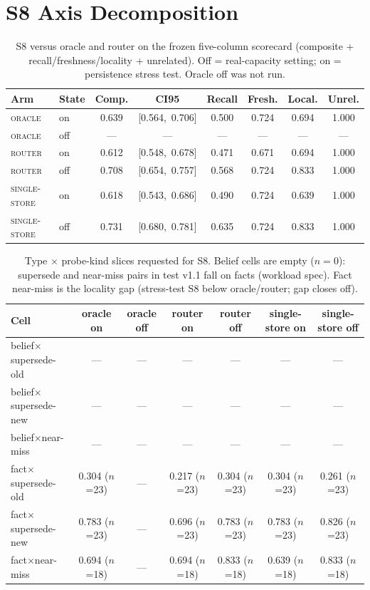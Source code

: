 \section{S8 Axis Decomposition}
\begin{table}[h]\centering
\caption{S8 versus oracle and router on the frozen five-column scorecard (composite + recall/freshness/locality + unrelated). Off = real-capacity setting; on = persistence stress test. Oracle off was not run.}
\label{tab:s8-axes}
\small\setlength{\tabcolsep}{3pt}
\begin{tabular}{llcccccc}\toprule
Arm & State & Comp. & CI95 & Recall & Fresh. & Local. & Unrel. \\
\midrule
\textsc{oracle} & on & 0.639 & [0.564,\ 0.706] & 0.500 & 0.724 & 0.694 & 1.000 \\
\textsc{oracle} & off & --- & --- & --- & --- & --- & --- \\
\textsc{router} & on & 0.612 & [0.548,\ 0.678] & 0.471 & 0.671 & 0.694 & 1.000 \\
\textsc{router} & off & 0.708 & [0.654,\ 0.757] & 0.568 & 0.724 & 0.833 & 1.000 \\
\textsc{single-store} & on & 0.618 & [0.543,\ 0.686] & 0.490 & 0.724 & 0.639 & 1.000 \\
\textsc{single-store} & off & 0.731 & [0.680,\ 0.781] & 0.635 & 0.724 & 0.833 & 1.000 \\
\bottomrule\end{tabular}
\end{table}
\begin{table}[h]\centering
\caption{Type $\times$ probe-kind slices requested for S8. Belief cells are empty ($n{=}0$): supersede and near-miss pairs in test v1.1 fall on facts (workload spec). Fact near-miss is the locality gap (stress-test S8 below oracle/router; gap closes off).}
\label{tab:s8-cells}
\small\setlength{\tabcolsep}{3pt}
\begin{tabular}{lcccccc}\toprule
Cell & oracle on & oracle off & router on & router off & single-store on & single-store off \\
\midrule
belief$\times$supersede-old & --- & --- & --- & --- & --- & --- \\
belief$\times$supersede-new & --- & --- & --- & --- & --- & --- \\
belief$\times$near-miss & --- & --- & --- & --- & --- & --- \\
fact$\times$supersede-old & 0.304 ($n$=23) & --- & 0.217 ($n$=23) & 0.304 ($n$=23) & 0.304 ($n$=23) & 0.261 ($n$=23) \\
fact$\times$supersede-new & 0.783 ($n$=23) & --- & 0.696 ($n$=23) & 0.783 ($n$=23) & 0.783 ($n$=23) & 0.826 ($n$=23) \\
fact$\times$near-miss & 0.694 ($n$=18) & --- & 0.694 ($n$=18) & 0.833 ($n$=18) & 0.639 ($n$=18) & 0.833 ($n$=18) \\
\bottomrule\end{tabular}
\end{table}

